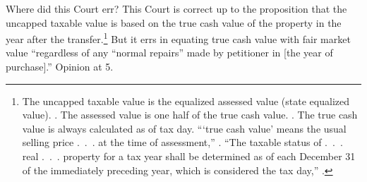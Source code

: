 \documentclass[12pt,\documentclassflag]{michiganCourtOfAppealsBrief}
\begin{document}

% 


Where did this Court err? This Court is correct up to the proposition 
that the uncapped taxable value is based on the true cash value of the property in the year after the transfer.\footnote{The uncapped taxable value is the equalized assessed value (state equalized value). \cite{MCL 211.27a(3)}. The assessed value is one half of the true cash value. \cite{MCL 211.27a(1)}. The true cash value is always calculated as of tax day. ```true cash value' means the usual selling price .~.~. at the time of assessment,'' \cite{MCL 211.27(1)}. ``The taxable status of .~.~. real .~.~. property for a tax year shall be determined as of each December 31 of the immediately preceding year, which is considered the tax day,'' \cite{MCL 211.2(2)}.}
But it errs in equating true cash value with fair market value ``regardless of any ``normal repairs'' made by petitioner in [the year of purchase].'' Opinion at 5.
\end{document}
